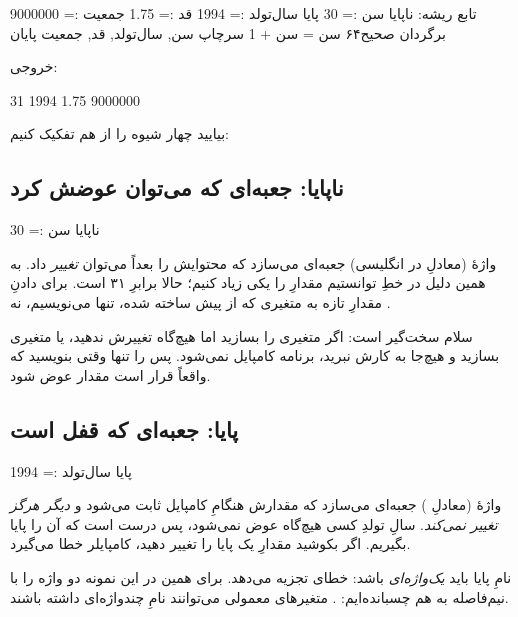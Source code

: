 \begin{salamfa}
تابع ریشه:
    ناپایا سن := 30
    پایا سال‌تولد := 1994
    قد := 1.75
    جمعیت := 9000000 برگردان صحیح۶۴
    سن = سن + 1
    سرچاپ سن, سال‌تولد, قد, جمعیت
پایان
\end{salamfa}

خروجی:

\begin{salamen}[language={}]
31 1994 1.75 9000000
\end{salamen}

بیایید چهار شیوه را از هم تفکیک کنیم:

\subsection{ناپایا: جعبه‌ای که می‌توان عوضش کرد}

\begin{salamfa}
ناپایا سن := 30
\end{salamfa}

واژهٔ  (معادلِ  در انگلیسی) جعبه‌ای می‌سازد که محتوایش را
بعداً می‌توان \emph{تغییر} داد. به همین دلیل در خطِ 
توانستیم مقدارِ  را یکی زیاد کنیم؛ حالا  برابرِ ۳۱ است. برای
دادنِ مقدارِ تازه به متغیری که از پیش ساخته شده، تنها \code{=} می‌نویسیم، نه
\code{:=}.

\begin{warn}
سلام سخت‌گیر است: اگر متغیری را  بسازید اما هیچ‌گاه تغییرش ندهید،
یا متغیری بسازید و هیچ‌جا به کارش نبرید، برنامه کامپایل نمی‌شود. پس
 را تنها وقتی بنویسید که واقعاً قرار است مقدار عوض شود.
\end{warn}

\subsection{پایا: جعبه‌ای که قفل است}

\begin{salamfa}
پایا سال‌تولد := 1994
\end{salamfa}

واژهٔ  (معادلِ ) جعبه‌ای می‌سازد که مقدارش هنگامِ کامپایل
ثابت می‌شود و \emph{دیگر هرگز تغییر نمی‌کند}. سالِ تولدِ کسی هیچ‌گاه عوض
نمی‌شود، پس درست است که آن را پایا بگیریم. اگر بکوشید مقدارِ یک پایا را تغییر
دهید، کامپایلر خطا می‌گیرد.

\begin{note}
نامِ پایا باید \emph{یک‌واژه‌ای} باشد:  خطای تجزیه
می‌دهد. برای همین در این نمونه دو واژه را با نیم‌فاصله به هم چسبانده‌ایم:
. متغیرهای معمولی می‌توانند نامِ چندواژه‌ای داشته باشند.
\end{note}

